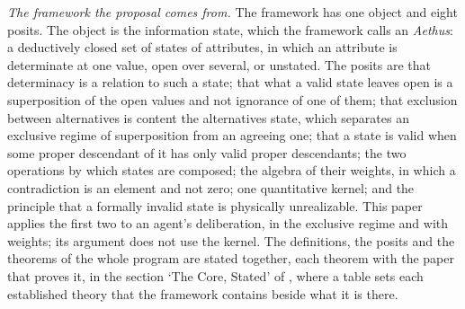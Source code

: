 \noindent \textit{The framework the proposal comes from.} The framework has one object and eight posits. The object is the information state, which the framework calls an \emph{Aethus}: a deductively closed set of states of attributes, in which an attribute is determinate at one value, open over several, or unstated. The posits are that determinacy is a relation to such a state; that what a valid state leaves open is a superposition of the open values and not ignorance of one of them; that exclusion between alternatives is content the alternatives state, which separates an exclusive regime of superposition from an agreeing one; that a state is valid when some proper descendant of it has only valid proper descendants; the two operations by which states are composed; the algebra of their weights, in which a contradiction is an element and not zero; one quantitative kernel; and the principle that a formally invalid state is physically unrealizable. This paper applies the first two to an agent's deliberation, in the exclusive regime and with weights; its argument does not use the kernel. The definitions, the posits and the theorems of the whole program are stated together, each theorem with the paper that proves it, in the section `The Core, Stated' of \cite{AethusBrief}, where a table sets each established theory that the framework contains beside what it is there.

